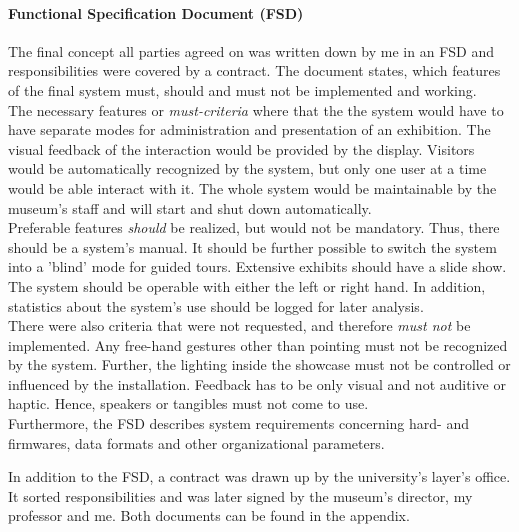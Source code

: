 \paragraph{Functional Specification Document (\ac{FSD})} The final concept all parties agreed on was written down by me in an \ac{FSD} and responsibilities were covered by a contract. The document states, which features of the final system must, should and must not be implemented and working.
\\
The necessary features or \textit{must-criteria} where that the the system would have to have separate modes for administration and presentation of an exhibition. The visual feedback of the interaction would be provided by the display. Visitors would be automatically recognized by the system, but only one user at a time would be able interact with it. The whole system would be maintainable by the museum's staff and will start and shut down automatically.
\\
Preferable features \textit{should} be realized, but would not be mandatory. Thus, there should be a system's manual. It should be further possible to switch the system into a 'blind' mode for guided tours. Extensive exhibits should have a slide show. The system should be operable with either the left or right hand. In addition, statistics about the system's use should be logged for later analysis.
\\
There were also criteria that were not requested, and therefore \textit{must not} be implemented. Any free-hand gestures other than pointing must not be recognized by the system. Further, the lighting inside the showcase must not be controlled or influenced by the installation. Feedback has to be only visual and not auditive or haptic. Hence, speakers or tangibles must not come to use. 
\\
Furthermore, the \ac{FSD} describes system requirements concerning hard- and firmwares, data formats and other organizational parameters. 

In addition to the \ac{FSD}, a contract was drawn up by the university's layer's office. It sorted responsibilities and was later signed by the museum's director, my professor and me. Both documents can be found in the appendix.

